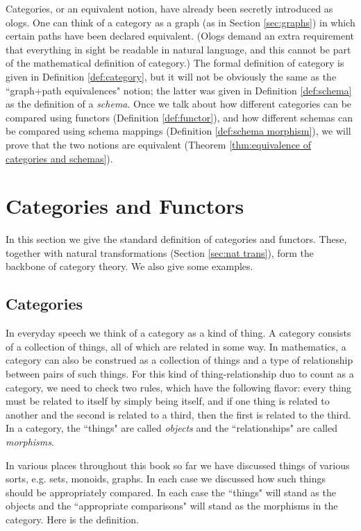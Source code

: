 \documentclass{book}
\theoremstyle{remark}
\theoremstyle{definition}
\begin{document}
Categories, or an equivalent notion, have already been secretly introduced as ologs. One can think of a category as a graph (as in Section \ref{sec:graphs}) in which certain paths have been declared equivalent. (Ologs demand an extra requirement that everything in sight be readable in natural language, and this cannot be part of the mathematical definition of category.) The formal definition of category is given in Definition \ref{def:category}, but it will not be obviously the same as the ``graph+path equivalences" notion; the latter was given in Definition \ref{def:schema} as the definition of a {\em schema}. Once we talk about how different categories can be compared using functors (Definition \ref{def:functor}), and how different schemas can be compared using schema mappings (Definition \ref{def:schema morphism}), we will prove that the two notions are equivalent (Theorem \ref{thm:equivalence of categories and schemas}).


\section{Categories and Functors}

In this section we give the standard definition of categories and functors. These, together with natural transformations (Section \ref{sec:nat trans}), form the backbone of category theory. We also give some examples.


\subsection{Categories}\label{sec:categories}

In everyday speech we think of a category as a kind of thing. A category consists of a collection of things, all of which are related in some way. In mathematics, a category can also be construed as a collection of things and a type of relationship between pairs of such things. For this kind of thing-relationship duo to count as a category, we need to check two rules, which have the following flavor: every thing must be related to itself by simply being itself, and if one thing is related to another and the second is related to a third, then the first is related to the third. In a category, the ``things" are called {\em objects} and the ``relationships" are called {\em morphisms}.

In various places throughout this book so far we have discussed things of various sorts, e.g. sets, monoids, graphs. In each case we discussed how such things should be appropriately compared. In each case the ``things" will stand as the objects and the ``appropriate comparisons" will stand as the morphisms in the category. Here is the definition.
\end{document}

